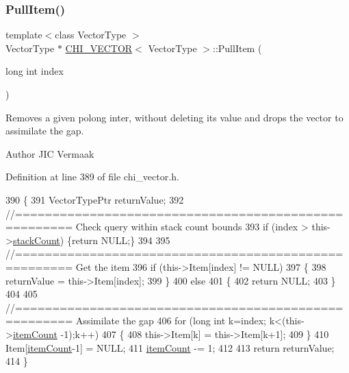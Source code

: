\subsubsection{\texorpdfstring{Pull\+Item()}{PullItem()}}
{\footnotesize\ttfamily template$<$class Vector\+Type $>$ \\
Vector\+Type $\ast$ \hyperlink{class_c_h_i___v_e_c_t_o_r}{C\+H\+I\+\_\+\+V\+E\+C\+T\+OR}$<$ Vector\+Type $>$\+::Pull\+Item (\begin{DoxyParamCaption}\item[{long int}]{index }\end{DoxyParamCaption})}

Removes a given polong inter, without deleting its value and drops the vector to assimilate the gap.

\begin{DoxyAuthor}{Author}
J\+IC Vermaak 
\end{DoxyAuthor}


Definition at line 389 of file chi\+\_\+vector.\+h.


\begin{DoxyCode}
390 \{
391     VectorTypePtr returnValue;
392     \textcolor{comment}{//===================================================== Check query within stack count bounds}
393     \textcolor{keywordflow}{if} (index > this->\hyperlink{class_c_h_i___v_e_c_t_o_r_a91ef30712b0ead293dfe1adc29fee555}{stackCount}) \{\textcolor{keywordflow}{return} NULL;\}
394 
395     \textcolor{comment}{//===================================================== Get the item}
396     \textcolor{keywordflow}{if} (this->Item[index] != NULL)
397     \{
398         returnValue = this->Item[index];
399     \}
400     \textcolor{keywordflow}{else}
401     \{
402         \textcolor{keywordflow}{return} NULL;
403     \}
404     
405     \textcolor{comment}{//===================================================== Assimilate the gap}
406     \textcolor{keywordflow}{for} (\textcolor{keywordtype}{long} \textcolor{keywordtype}{int} k=index; k<(this->\hyperlink{class_c_h_i___v_e_c_t_o_r_a0d37a8a4650059da0888be2d9c38487a}{itemCount} -1);k++)
407     \{
408         this->Item[k] = this->Item[k+1];
409     \}
410     Item[\hyperlink{class_c_h_i___v_e_c_t_o_r_a0d37a8a4650059da0888be2d9c38487a}{itemCount}-1] = NULL;
411     \hyperlink{class_c_h_i___v_e_c_t_o_r_a0d37a8a4650059da0888be2d9c38487a}{itemCount} -= 1;
412 
413     \textcolor{keywordflow}{return} returnValue;
414 \}
\end{DoxyCode}
\mbox{\label{class_c_h_i___v_e_c_t_o_r_a9a3e5ce973c6bf31abdb55b6dc4cda0e_a9a3e5ce973c6bf31abdb55b6dc4cda0e}} 
